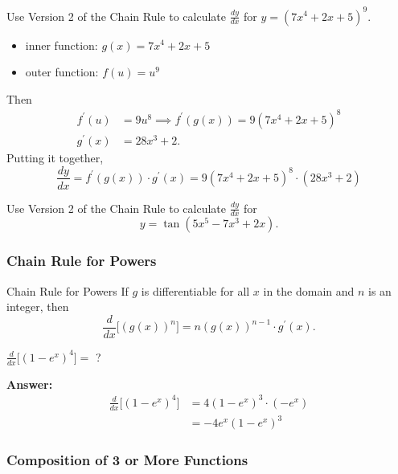 \documentclass[cal1spr16Lectures.tex]{subfiles}
\begin{document}
\begin{frame}\footnotesize
\begin{ex} 
Use Version 2 of the Chain Rule to calculate $\textstyle\frac{dy}{dx}$ for $y=(7x^4+2x+5)^9$. 
\end{ex}
\begin{itemize}\footnotesize
\item inner function: $g(x)=7x^4+2x+5$ 
\item outer function: $f(u)=u^9$
\end{itemize}
Then
\vspace{-0.5pc}
\begin{align*}
f^{\prime}(u) &= 9u^8 \implies f^{\prime}(g(x))=9(7x^4+2x+5)^8 \\
g^{\prime}(x) &=28x^3+2.
\end{align*}
Putting it together,
\[\frac{dy}{dx}=f^{\prime}(g(x)) \cdot g^{\prime}(x) = 9(7x^4+2x+5)^8 \cdot (28x^3+2)\]
\end{frame}

\begin{frame}
\begin{exe}
Use Version 2 of the Chain Rule to calculate $\textstyle\frac{dy}{dx}$ for
\[
y=\tan{(5x^5-7x^3+2x)}.
\]
\end{exe}
\end{frame}

\subsubsection{Chain Rule for Powers}

\begin{frame}[allowframebreaks]{\small Chain Rule for Powers}
If $g$ is differentiable for all $x$ in the domain and $n$ is an integer, then
\[\frac{d}{dx} \bigg[\left(g(x)\right)^n \bigg]=n(g(x))^{n-1} \cdot g^{\prime}(x).\]

\framebreak
\begin{ex} $\frac{d}{dx} \bigg[ (1-e^x)^4 \bigg] =$ ? \end{ex}
{\bf Answer:}
\begin{align*}
\frac{d}{dx} \bigg[ (1-e^x)^4 \bigg] &= 4(1-e^x)^3 \cdot (-e^x) \\
 &= -4e^x (1-e^x)^3
\end{align*}
\end{frame}

\subsubsection{Composition of 3 or More Functions}
\end{document}
